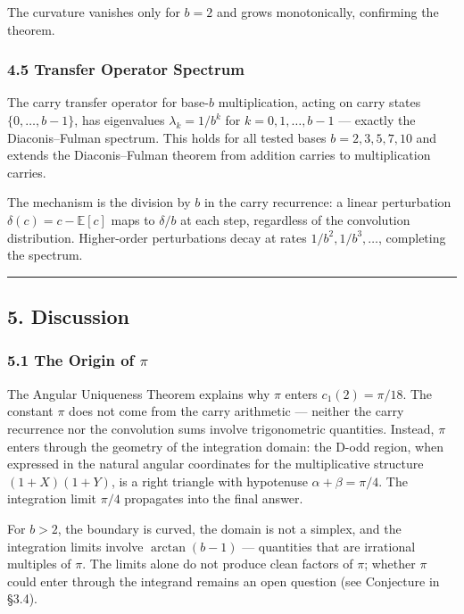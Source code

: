 \documentclass[
  11pt,
]{article}
\begin{document}
The curvature vanishes only for \(b = 2\) and grows monotonically, confirming
the theorem.

\subsubsection{4.5 Transfer Operator Spectrum}\label{transfer-operator-spectrum}

The carry transfer operator for base-\(b\) multiplication, acting on carry
states \(\lbrace{}0, \ldots, b-1\rbrace{}\), has eigenvalues
\(\lambda_k = 1/b^k\) for \(k = 0, 1, \ldots, b-1\) --- exactly the
Diaconis--Fulman spectrum. This holds for all tested bases
\(b = 2, 3, 5, 7, 10\) and extends the Diaconis--Fulman theorem from addition
carries to multiplication carries.

The mechanism is the division by \(b\) in the carry recurrence: a linear
perturbation \(\delta(c) = c - \mathbb{E}[c]\) maps to \(\delta/b\) at each
step, regardless of the convolution distribution. Higher-order perturbations
decay at rates \(1/b^2, 1/b^3, \ldots\), completing the spectrum.

\begin{center}\rule{0.5\linewidth}{0.5pt}\end{center}

\newpage

\subsection{5. Discussion}\label{discussion}

\subsubsection{\texorpdfstring{5.1 The Origin of
\(\pi\)}{5.1 The Origin of \textbackslash pi}}\label{the-origin-of-pi}

The Angular Uniqueness Theorem explains why \(\pi\) enters \(c_1(2) = \pi/18\).
The constant \(\pi\) does not come from the carry arithmetic --- neither the
carry recurrence nor the convolution sums involve trigonometric quantities.
Instead, \(\pi\) enters through the geometry of the integration domain: the
D-odd region, when expressed in the natural angular coordinates for the
multiplicative structure \((1+X)(1+Y)\), is a right triangle with hypotenuse
\(\alpha + \beta = \pi/4\). The integration limit \(\pi/4\) propagates into the
final answer.

For \(b > 2\), the boundary is curved, the domain is not a simplex, and the
integration limits involve \(\arctan(b-1)\) --- quantities that are irrational
multiples of \(\pi\). The limits alone do not produce clean factors of \(\pi\);
whether \(\pi\) could enter through the integrand remains an open question (see
Conjecture in §3.4).
\end{document}
